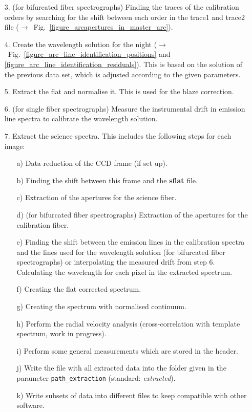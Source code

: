 \documentclass[10pt,a4paper]{article}
\begin{document}
\begin{itemize}
\begin{itemize}
  \end{itemize}
  \item[3.] (for bifurcated fiber spectrographs) Finding the traces of the calibration orders by searching for the shift between each order in the trace1 and trace2 file ($\rightarrow$~Fig.~\ref{figure_arcapertures_in_master_arc}). 
  \item[4.] Create the wavelength solution for the night ($\rightarrow$~Fig.~\ref{figure_arc_line_identification_positions} and \ref{figure_arc_line_identification_residuals}). This is based on the solution of the previous data set, which is adjusted according to the given parameters.
  \item[5.] Extract the flat and normalise it. This is used for the blaze correction.
  \item[6.] (for single fiber spectrographs) Measure the instrumental drift in emission line spectra to calibrate the wavelength solution.
  \item[7.] Extract the science spectra. This includes the following steps for each image:
  \begin{itemize}
    \item[a)] Data reduction of the CCD frame (if set up).
    \item[b)] Finding the shift between this frame and the \textbf{sflat} file.
    \item[c)] Extraction of the apertures for the science fiber.
    \item[d)] (for bifurcated fiber spectrographs) Extraction of the apertures for the calibration fiber.
    \item[e)] Finding the shift between the emission lines in the calibration spectra and the lines used for the wavelength solution (for bifurcated fiber spectrographs) or interpolating the measured drift from step 6. Calculating the wavelength for each pixel in the extracted spectrum.
    \item[f)] Creating the flat corrected spectrum.
    \item[g)] Creating the spectrum with normalised continuum.
    \item[h)] Perform the radial velocity analysis (cross-correlation with template spectrum, work in progress).
    \item[i)] Perform some general measurements which are stored in the header.
    \item[j)] Write the file with all extracted data into the folder given in the parameter \verb|path_extraction| (standard: \textit{extracted}).
    \item[k)] Write subsets of data into different files to keep compatible with other software.
  \end{itemize}
\end{itemize}
\end{document}
